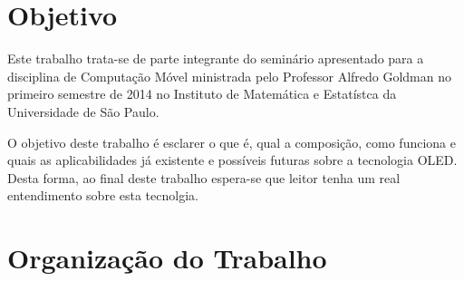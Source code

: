 \section{Objetivo}
\label{sec:objetivo}

Este trabalho trata-se de parte integrante do seminário apresentado para a disciplina de Computação Móvel ministrada pelo Professor Alfredo Goldman no primeiro semestre de 2014 no Instituto de Matemática e Estatístca da Universidade de São Paulo.

O objetivo deste trabalho é esclarer o que é, qual a composição, como funciona e quais as aplicabilidades já existente e possíveis futuras sobre a tecnologia OLED. Desta forma, ao final deste trabalho espera-se que leitor tenha um real entendimento sobre esta tecnolgia.

\section{Organização do Trabalho}
\label{sec:organizacaodotrabalho}

